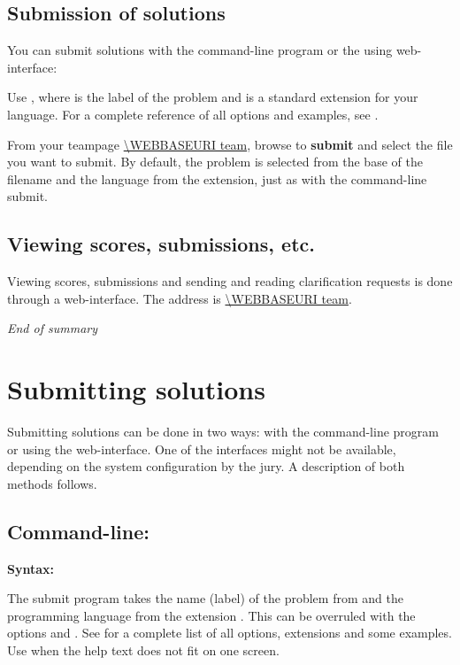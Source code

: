 \subsection{Submission of solutions}

You can submit solutions with the command-line program  or
the using web-interface:
\begin{description}[\breaklabel\setlabelstyle{\bfseries}]
\item[Command-line] 
Use , where  is the
label of the problem and  is a standard extension for
your language.  For a complete reference of all options and examples,
see .
\item[Web-interface]
From your teampage \url{\WEBBASEURI team}, browse to
\textbf{submit} and select the file you want to submit. By default,
the problem is selected from the base of the filename and the language
from the extension, just as with the command-line submit.
\end{description}

\subsection{Viewing scores, submissions, etc.}

Viewing scores, submissions and sending and reading clarification
requests is done through a web-interface. The address is
\url{\WEBBASEURI team}.

\emph{End of summary}

\newpage
\section{Submitting solutions}\label{submit}

Submitting solutions can be done in two ways: with the command-line
program  or using the web-interface. One of the
interfaces might not be available, depending on the system
configuration by the jury. A description of both methods follows.

\subsection{Command-line: }

\textbf{Syntax:} 

The submit program takes the name (label) of the problem from
 and the programming language from the extension
. This can be overruled with the options
 and .
See  for a complete list of all options,
extensions and some examples.  Use 
when the help text does not fit on one screen.

